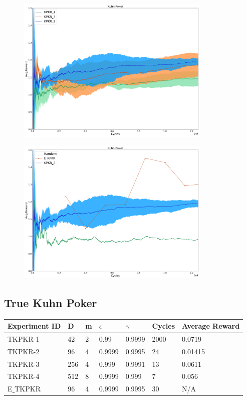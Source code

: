 \documentclass{article}
\theoremstyle{definition}
\newtheorem{primary statistics}[definition]{Primary Statistics}
\newtheorem{auxiliary statistics}[definition]{Auxiliary Statistics}
\begin{document}
 \begin{figure}[h]
 \centering
    \includegraphics[width=9.3cm]{4_Kuhn_Poker}
\end{figure}

 \begin{figure}[h]
 \centering
    \includegraphics[width=9.3cm]{Kuhn_Poker}
\end{figure}

\newpage

\subsection{True Kuhn Poker}
\begin{tabular}{|l|l|l|l|l|l|l|}
\hline \centering
 Experiment ID& D & m & $\epsilon$ & $\gamma$ & Cycles & Average Reward \\ \hline
TKPKR-1  & 42        & 2           & 0.99        & 0.9999            & 2000   & 0.0719        \\ \hline
TKPKR-2  & 96        & 4           & 0.9999      & 0.9995            & 24     & 0.01415         \\ \hline
TKPKR-3  & 256       & 4           & 0.999       & 0.9991            & 13     & 0.0611         \\ \hline
TKPKR-4  & 512       & 8           & 0.9999      & 0.999             & 7      & 0.056      \\ \hline 
E\underline{ }TKPKR  & 96       & 4           & 0.9999      & 0.9995             & 30      & N/A      \\ \hline        
\end{tabular}
\end{document}
